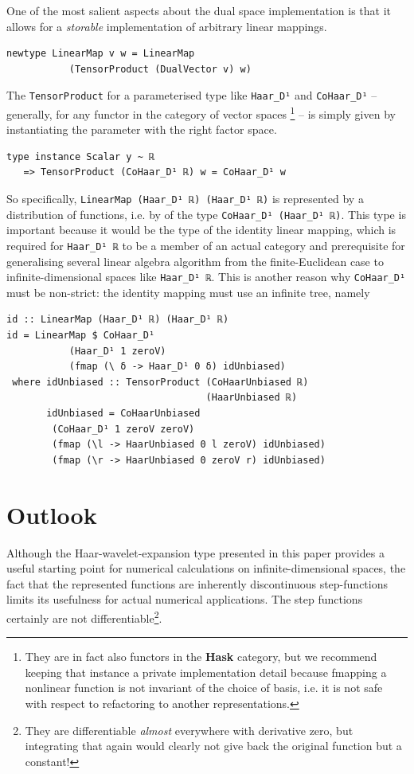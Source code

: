 \documentclass[final,sigplan]{acmart}\settopmatter{printfolios=true,printccs=false,printacmref=false}
\theoremstyle{acmplain}
\theoremstyle{acmdefinition}
\begin{document}
One of the most salient aspects about the dual space implementation is that it allows for a \emph{storable} implementation of arbitrary linear mappings.
\begin{lstlisting}
newtype LinearMap v w = LinearMap
           (TensorProduct (DualVector v) w)
\end{lstlisting}
The \lstinline`TensorProduct` for a parameterised type like \lstinline`Haar_D¹` and \lstinline`CoHaar_D¹` -- generally, for any functor in the category of vector spaces%
\footnote{They are in fact also functors in the \textbf{Hask} category, but we recommend keeping that instance a private implementation detail because fmapping a nonlinear function is not invariant of the choice of basis, i.e. it is not safe with respect to refactoring to another representations.
} -- is simply given by instantiating the parameter with the right factor space.
\begin{lstlisting}
type instance Scalar y ~ ℝ
   => TensorProduct (CoHaar_D¹ ℝ) w = CoHaar_D¹ w
\end{lstlisting}
So specifically, \lstinline`LinearMap (Haar_D¹ ℝ) (Haar_D¹ ℝ)` is represented by a distribution of functions, i.e. by of the type \lstinline`CoHaar_D¹ (Haar_D¹ ℝ)`.
This type is important because it would be the type of the identity linear mapping, which is required for \lstinline`Haar_D¹ ℝ` to be a member of an actual category and prerequisite for generalising several linear algebra algorithm from the finite-Euclidean case to infinite-dimensional spaces like \lstinline`Haar_D¹ ℝ`.
This is another reason why \lstinline`CoHaar_D¹` must be non-strict: the identity mapping must use an infinite tree, namely
\begin{lstlisting}
id :: LinearMap (Haar_D¹ ℝ) (Haar_D¹ ℝ)
id = LinearMap $ CoHaar_D¹
           (Haar_D¹ 1 zeroV)
           (fmap (\ δ -> Haar_D¹ 0 δ) idUnbiased)
 where idUnbiased :: TensorProduct (CoHaarUnbiased ℝ)
                                   (HaarUnbiased ℝ)
       idUnbiased = CoHaarUnbiased
        (CoHaar_D¹ 1 zeroV zeroV)
        (fmap (\l -> HaarUnbiased 0 l zeroV) idUnbiased)
        (fmap (\r -> HaarUnbiased 0 zeroV r) idUnbiased)
\end{lstlisting}

\section{Outlook}
Although the Haar-wavelet-expansion type presented in this paper provides a useful starting point for numerical calculations on infinite-dimensional spaces, the fact that the represented functions are inherently discontinuous step-functions limits its usefulness for actual numerical applications. The step functions certainly are not differentiable\footnote{%
They are differentiable \emph{almost} everywhere with derivative zero, but integrating that again would clearly not give back the original function but a constant!}.
\end{document}
